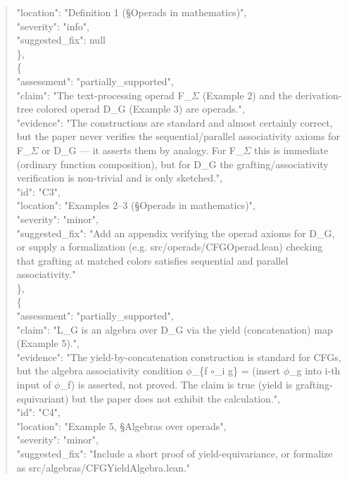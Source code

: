 \documentclass[11pt]{article}
\begin{document}
\begin{quote}
      "location": "Definition 1 (§Operads in mathematics)",\\
      "severity": "info",\\
      "suggested\_fix": null\\
    \},\\
    \{\\
      "assessment": "partially\_supported",\\
      "claim": "The text-processing operad F\_\ensuremath{\Sigma} (Example 2) and the derivation-tree colored operad D\_G (Example 3) are operads.",\\
      "evidence": "The constructions are standard and almost certainly correct, but the paper never verifies the sequential/parallel associativity axioms for F\_\ensuremath{\Sigma} or D\_G --- it asserts them by analogy. For F\_\ensuremath{\Sigma} this is immediate (ordinary function composition), but for D\_G the grafting/associativity verification is non-trivial and is only sketched.",\\
      "id": "C3",\\
      "location": "Examples 2--3 (§Operads in mathematics)",\\
      "severity": "minor",\\
      "suggested\_fix": "Add an appendix verifying the operad axioms for D\_G, or supply a formalization (e.g. src/operads/CFGOperad.lean) checking that grafting at matched colors satisfies sequential and parallel associativity."\\
    \},\\
    \{\\
      "assessment": "partially\_supported",\\
      "claim": "L\_G is an algebra over D\_G via the yield (concatenation) map (Example 5).",\\
      "evidence": "The yield-by-concatenation construction is standard for CFGs, but the algebra associativity condition \ensuremath{\phi}\_\{f \ensuremath{\circ}\_i g\} = (insert \ensuremath{\phi}\_g into i-th input of \ensuremath{\phi}\_f) is asserted, not proved. The claim is true (yield is grafting-equivariant) but the paper does not exhibit the calculation.",\\
      "id": "C4",\\
      "location": "Example 5, §Algebras over operads",\\
      "severity": "minor",\\
      "suggested\_fix": "Include a short proof of yield-equivariance, or formalize as src/algebras/CFGYieldAlgebra.lean."\\

\end{quote}
\end{document}
